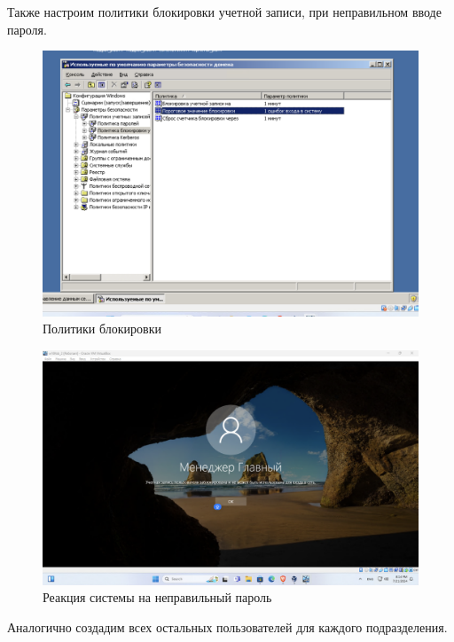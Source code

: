 Также настроим политики блокировки учетной записи, при неправильном вводе пароля.
\begin{figure}[H]
  \centering
  \includegraphics[width=1\textwidth]{pict/prac/71}
  \caption{Политики блокировки}
\end{figure}

\begin{figure}[H]
  \centering
  \includegraphics[width=1\textwidth]{pict/prac/79}
  \caption{Реакция системы на неправильный пароль}
\end{figure}



Аналогично создадим всех остальных пользователей для каждого подразделения.

